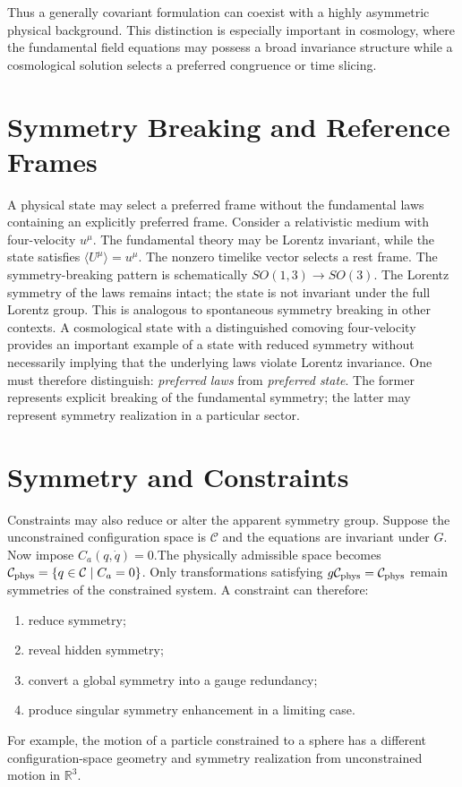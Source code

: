 Thus a generally covariant formulation can coexist with a highly asymmetric physical background.
This distinction is especially important in cosmology, where the fundamental
field equations may possess a broad invariance structure while a cosmological
solution selects a preferred congruence or time slicing.

\section{ Symmetry Breaking and Reference Frames}
\label{sp:rf}

A physical state may select a preferred frame without the fundamental laws containing an explicitly preferred frame.
Consider a relativistic medium with four-velocity $u^\mu$.
The fundamental theory may be Lorentz invariant, while the state satisfies
$\langle U^\mu\rangle=u^\mu$.
The nonzero timelike vector selects a rest frame.
The symmetry-breaking pattern is schematically
$SO(1,3)\rightarrow SO(3)$.
The Lorentz symmetry of the laws remains intact; the state is not invariant under the full Lorentz group.
This is analogous to spontaneous symmetry breaking in other contexts.
A cosmological state with a distinguished comoving four-velocity provides an important example of a state with reduced symmetry without necessarily implying that the underlying laws violate Lorentz invariance.
One must therefore distinguish: \emph{preferred laws} from \emph{preferred state}.
The former represents explicit breaking of the fundamental symmetry; 
the latter may represent symmetry realization in a particular sector.

\section{ Symmetry and Constraints}
\label{sp:sc}

Constraints may also reduce or alter the apparent symmetry group.
Suppose the unconstrained configuration space is $\mathcal{C}$ and the equations 
are invariant under $G$.
Now impose $C_a(q,\dot q)=0$.The physically admissible space becomes
$\mathcal{C}_{\rm phys}=\{q\in\mathcal{C}\mid C_a=0\}$.
Only transformations satisfying 
$g\mathcal{C}_{\rm phys}=\mathcal{C}_{\rm phys}$
remain symmetries of the constrained system.
A constraint can therefore:
\begin{enumerate}
\item reduce symmetry;
\item reveal hidden symmetry;
\item convert a global symmetry into a gauge redundancy;
\item produce singular symmetry enhancement in a limiting case.
\end{enumerate}
For example, the motion of a particle constrained to a sphere has a different 
configuration-space geometry and symmetry realization from unconstrained motion
in $\mathbb{R}^3$.


